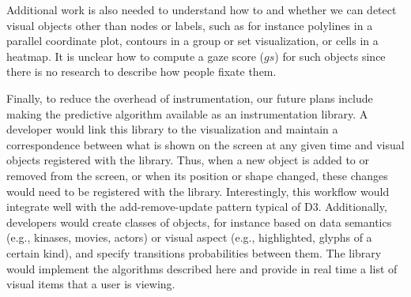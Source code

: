 Additional work is also needed to understand how to and whether we can detect visual objects other than nodes or labels, such as for instance polylines in a parallel coordinate plot, contours in a group or set visualization, or cells in a heatmap. It is unclear how to compute a gaze score ($gs$) for such objects since there is no research to describe how people fixate them. 

Finally, to reduce the overhead of instrumentation, our future plans include making the predictive algorithm available as an instrumentation library. A developer would link this library to the visualization and maintain a correspondence between what is shown on the screen at any given time and visual objects registered with the library. Thus, when a new object is added to or removed from the screen, or when its position or shape changed, these changes would need to be registered with the library. Interestingly, this workflow would integrate well with the add-remove-update pattern typical of D3. Additionally, developers would create classes of objects, for instance based on data semantics (e.g., kinases, movies, actors) or visual aspect (e.g., highlighted, glyphs of a certain kind), and specify transitions probabilities between them. The library would implement the algorithms described here and provide in real time a list of visual items that a user is viewing.
  
